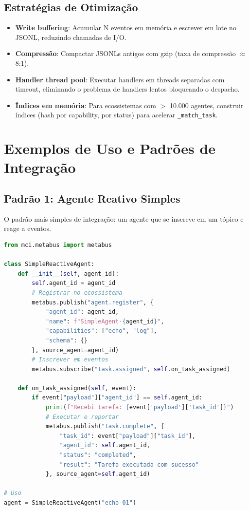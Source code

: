\subsection{Estratégias de Otimização}

\begin{itemize}
    \item \textbf{Write buffering}: Acumular N eventos em memória e escrever em lote no JSONL, reduzindo chamadas de I/O.
    \item \textbf{Compressão}: Compactar JSONLs antigos com gzip (taxa de compressão $\approx$ 8:1).
    \item \textbf{Handler thread pool}: Executar handlers em threads separadas com timeout, eliminando o problema de handlers lentos bloqueando o despacho.
    \item \textbf{Índices em memória}: Para ecossistemas com $>$ 10.000 agentes, construir índices (hash por capability, por status) para acelerar \texttt{\_match\_task}.
\end{itemize}

\section{Exemplos de Uso e Padrões de Integração}
\label{sec:integration-patterns}

\subsection{Padrão 1: Agente Reativo Simples}

O padrão mais simples de integração: um agente que se inscreve em um tópico e reage a eventos.

\begin{lstlisting}[language=Python, caption={Agente reativo simples}, label={lst:reactive-agent}]
from mci.metabus import metabus

class SimpleReactiveAgent:
    def __init__(self, agent_id):
        self.agent_id = agent_id
        # Registrar no ecossistema
        metabus.publish("agent.register", {
            "agent_id": agent_id,
            "name": f"SimpleAgent-{agent_id}",
            "capabilities": ["echo", "log"],
            "schema": {}
        }, source_agent=agent_id)
        # Inscrever em eventos
        metabus.subscribe("task.assigned", self.on_task_assigned)
    
    def on_task_assigned(self, event):
        if event["payload"]["agent_id"] == self.agent_id:
            print(f"Recebi tarefa: {event['payload']['task_id']}")
            # Executar e reportar
            metabus.publish("task.complete", {
                "task_id": event["payload"]["task_id"],
                "agent_id": self.agent_id,
                "status": "completed",
                "result": "Tarefa executada com sucesso"
            }, source_agent=self.agent_id)

# Uso
agent = SimpleReactiveAgent("echo-01")
\end{lstlisting}

